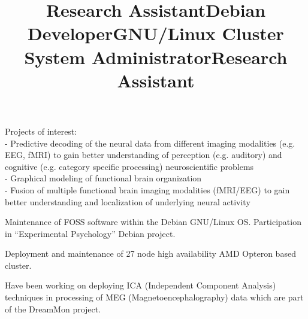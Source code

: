\documentclass[12pt,overlapped,line]{res}
\begin{document}
\begin{resume}
 \title{Research Assistant}
 \begin{position}
   Projects of interest:\\
   - Predictive decoding of the neural data from different imaging
     modalities (e.g. EEG, fMRI) to gain better understanding of
     perception (e.g. auditory) and cognitive (e.g. category specific
     processing) neuroscientific problems \\
   - Graphical modeling of functional brain organization \\
   - Fusion of multiple functional brain imaging modalities
     (f{MRI}/{EEG}) to gain better understanding and localization of
     underlying neural activity
 \end{position}


 \title{Debian Developer}
 \location{}
 \begin{position}
   Maintenance of FOSS software within the Debian GNU/Linux OS.
   Participation in ``Experimental Psychology'' Debian project.
 \end{position}

 \title{GNU/Linux Cluster System Administrator}
 \begin{position}
   Deployment and maintenance of 27 node high availability {AMD}
   {O}pteron based cluster. %
 \end{position}

 \title{Research Assistant}
 \begin{position}
   Have been working  on deploying ICA (Independent Component
   Analysis) techniques in processing of MEG (Magnetoencephalography)
   data which are part of the DreamMon project.


\end{position}
\end{resume}
\end{document}
